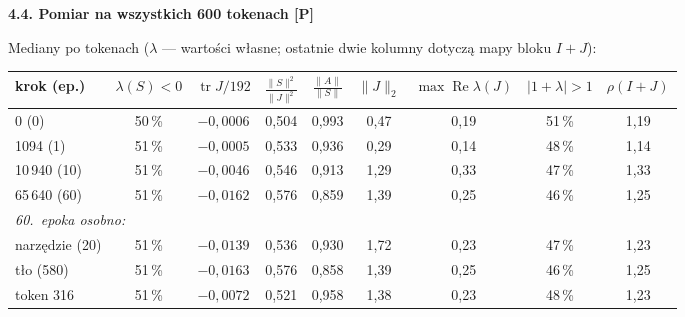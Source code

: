 \documentclass[a4paper,11pt]{article}
\newcommand{\stP}{\textcolor{pom}{\textsf{\textbf{[P]}}}}
\newcommand{\tr}{\operatorname{tr}}
\newcommand{\elem}[1]{\par\medskip\noindent\textbf{#1}\par\nopagebreak}
\begin{document}
\elem{4.4. Pomiar na wszystkich 600 tokenach \stP}
Mediany po tokenach ($\lambda$ --- wartości własne; ostatnie dwie kolumny dotyczą mapy bloku $I+J$):
\begin{center}\small
\begin{tabular}{lcccccccc}\toprule
krok (ep.) & $\lambda(S)<0$ & $\tr J/192$ & $\frac{\lVert S\rVert^2}{\lVert J\rVert^2}$ & $\frac{\lVert A\rVert}{\lVert S\rVert}$ & $\lVert J\rVert_2$ & $\max\operatorname{Re}\lambda(J)$ & $|1{+}\lambda|>1$ & $\rho(I{+}J)$\\\midrule
0 (0) & 50\,\% & $-0{,}0006$ & 0,504 & 0,993 & 0,47 & 0,19 & 51\,\% & 1,19\\
1094 (1) & 51\,\% & $-0{,}0005$ & 0,533 & 0,936 & 0,29 & 0,14 & 48\,\% & 1,14\\
10\,940 (10) & 51\,\% & $-0{,}0046$ & 0,546 & 0,913 & 1,29 & 0,33 & 47\,\% & 1,33\\
65\,640 (60) & 51\,\% & $-0{,}0162$ & 0,576 & 0,859 & 1,39 & 0,25 & 46\,\% & 1,25\\\midrule
\multicolumn{9}{l}{\emph{60.~epoka osobno:}}\\
narzędzie (20) & 51\,\% & $-0{,}0139$ & 0,536 & 0,930 & 1,72 & 0,23 & 47\,\% & 1,23\\
tło (580) & 51\,\% & $-0{,}0163$ & 0,576 & 0,858 & 1,39 & 0,25 & 46\,\% & 1,25\\
token 316 & 51\,\% & $-0{,}0072$ & 0,521 & 0,958 & 1,38 & 0,23 & 48\,\% & 1,23\\\bottomrule
\end{tabular}
\end{center}
\end{document}
